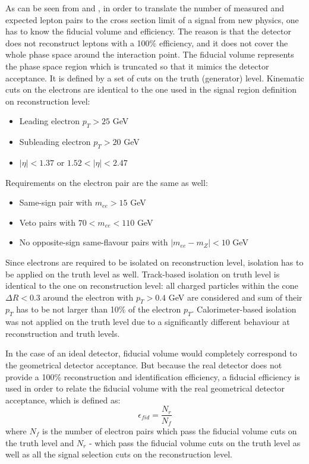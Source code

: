 As can be seen from  and , in order to translate the number of measured and expected lepton pairs 
to the cross section limit of a signal from new physics, one has to know the fiducial volume and efficiency.
The reason is that the detector does not reconstruct leptons with a 100$\%$ efficiency, and it does not cover the whole phase space around the interaction point.
The fiducial volume represents the phase space region which is truncated so that it mimics the detector acceptance.
It is defined by a set of cuts on the truth (generator) level. 
Kinematic cuts on the electrons are identical to the one used in the signal region definition on reconstruction level:
\begin{itemize}
 \item Leading electron $p_T > 25$ GeV
 \item Subleading electron $p_T > 20$ GeV
 \item $|\eta|<1.37$ or $1.52<|\eta|<2.47$
\end{itemize}
Requirements on the electron pair are the same as well:
\begin{itemize}
 \item Same-sign pair with $m_{ee} > 15$ GeV
 \item Veto pairs with $70 < m_{ee} < 110$ GeV
 \item No opposite-sign same-flavour pairs with $|m_{ee} - m_{Z}| < 10$ GeV
\end{itemize}
Since electrons are required to be isolated on reconstruction level, isolation has to be applied on the truth level as well.
Track-based isolation on truth level is identical to the one on reconstruction level:
all charged particles within the cone $\Delta R < 0.3$ around the electron with $p_T > 0.4$ GeV are considered and
sum of their $p_T$ has to be not larger than 10$\%$ of the electron $p_T$.
Calorimeter-based isolation was not applied on the truth level due to a significantly different behaviour at reconstruction and truth levels.

In the case of an ideal detector, fiducial volume would completely correspond to the geometrical detector acceptance.
But because the real detector does not provide a 100$\%$ reconstruction and identification efficiency, a fiducial efficiency is used in order to relate the fiducial volume with the real geometrical detector acceptance, which is defined as:
\begin{equation}
 \epsilon_{fid} = \dfrac{N_r}{N_f}
\end{equation}
where $N_f$ is the number of electron pairs which pass the fiducial volume cuts on the truth level and $N_r$ - which pass the fiducial volume cuts on the truth level 
as well as all the signal selection cuts on the reconstruction level.

